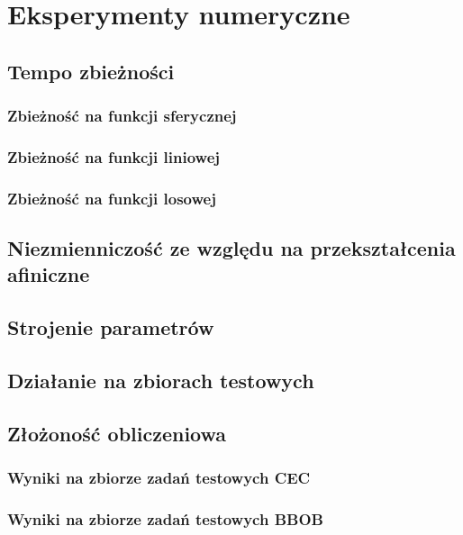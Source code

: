 \newpage
\section{Eksperymenty numeryczne}
\label{sec:eksperymenty}
\subsection{Tempo zbieżności}
\subsubsection{Zbieżność na funkcji sferycznej}
\subsubsection{Zbieżność na funkcji liniowej}
\subsubsection{Zbieżność na funkcji losowej}
\subsection{Niezmienniczość ze względu na przekształcenia afiniczne}
\subsection{Strojenie parametrów}
\subsection{Działanie na zbiorach testowych}
\subsection{Złożoność obliczeniowa}
\subsubsection{Wyniki na zbiorze zadań testowych CEC}
\subsubsection{Wyniki na zbiorze zadań testowych BBOB}


